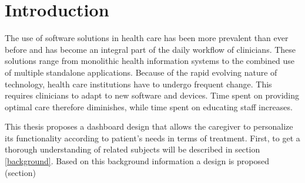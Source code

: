 \section{Introduction}

The use of software solutions in health care has been more prevalent than ever before and has become an integral part of the daily workflow of clinicians. These solutions range from monolithic health information systems to the combined use of multiple standalone applications. Because of the rapid evolving nature of technology, health care institutions have to undergo frequent change. This requires clinicians to adapt to new software and devices. Time spent on providing optimal care therefore diminishes, while time spent on educating staff increases.



This thesis proposes a dashboard design that allows the caregiver to personalize its functionality according to patient's needs in terms of treatment. First, to get a thorough understanding of related subjects will be described in section \ref{background}. Based on this background information a design is proposed (section)